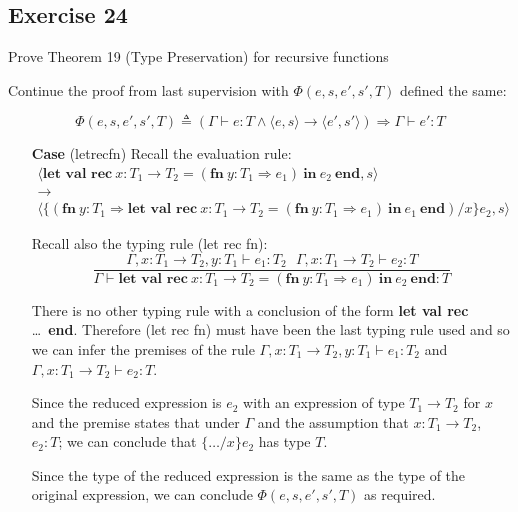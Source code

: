 \documentclass[10pt,\jkfside,a4paper]{article}
\begin{document}
\subsection*{Exercise 24}

Prove Theorem 19 (Type Preservation) for recursive functions

Continue the proof from last supervision with $\Phi(e, s, e', s', T)$ defined
the same:

\[
\Phi(e, s, e', s', T) \triangleq \left(\Gamma \vdash e: T \wedge \langle e, s
\rangle \to \langle e', s' \rangle\right) \Longrightarrow \Gamma \vdash e': T
\]

\begin{itemize}

\item [\textbf{Case}] (letrecfn) Recall the evaluation rule:
\begin{gather*}
\langle \textbf{let val rec} \ x : T_1 \to T_2 = (\textbf{fn} \ y: T_1
\Rightarrow e_1) \ \textbf{in} \ e_2 \ \textbf{end}, s\rangle \\
\to \\
\langle \{(\textbf{fn} \ y: T_1 \Rightarrow \textbf{let val rec} \ x : T_1 \to T_2 = (\textbf{fn} \ y: T_1
\Rightarrow e_1) \ \textbf{in} \ e_1 \ \textbf{end})/x\}e_2, s \rangle
\end{gather*}

Recall also the typing rule (let rec fn):
\[
\dfrac{
\Gamma, x: T_1 \to T_2, y: T_1 \vdash e_1: T_2 \ \ \ \Gamma, x: T_1 \to T_2
\vdash e_2: T
}{
\Gamma \vdash \textbf{let val rec} \ x : T_1 \to T_2 = (\textbf{fn} \ y: T_1
\Rightarrow e_1) \ \textbf{in} \ e_2 \ \textbf{end}: T
}
\]

There is no other typing rule with a conclusion of the form \textbf{let val
rec} \ldots \ \textbf{end}. Therefore (let rec fn) must have been the last
typing rule used and so we can infer the premises of the rule $\Gamma, x:
T_1 \to T_2, y: T_1 \vdash e_1 : T_2$ and $\Gamma, x : T_1 \to T_2 \vdash
e_2 : T$.

Since the reduced expression is $e_2$ with an expression of type $T_1 \to
T_2$ for $x$ and the premise states that under $\Gamma$ and the assumption
that $x: T_1 \to T_2$, $e_2 : T$; we can conclude that $\{\dots/x\}e_2$ has
type $T$.

Since the type of the reduced expression is the same as the type of the
original expression, we can conclude $\Phi(e, s, e', s', T)$ as required.

\end{itemize}
\end{document}
